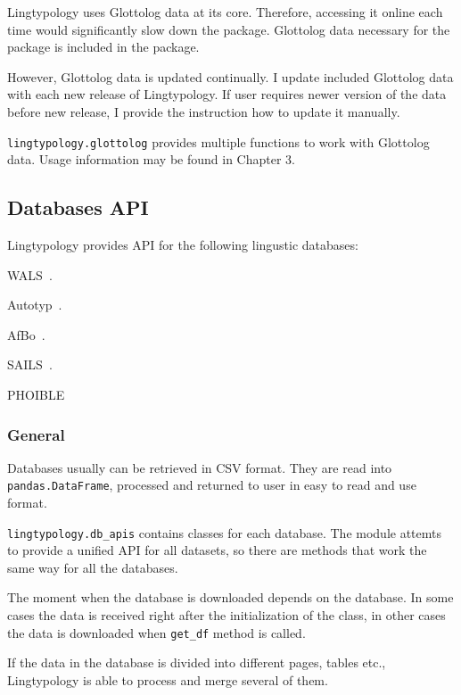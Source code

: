 \documentclass[a4paper,12pt]{article}
\begin{document}
Lingtypology uses Glottolog data at its core. Therefore, accessing it online each time would significantly slow down the package. Glottolog data necessary for the package is included in the package.

However, Glottolog data is updated continually. I update included Glottolog data with each new release of Lingtypology. If user requires newer version of the data before new release, I provide the instruction how to update it manually.

\texttt{lingtypology.glottolog} provides multiple functions to work with Glottolog data. Usage information may be found in Chapter 3.

\subsection{Databases API}

Lingtypology provides API for the following lingustic databases:
\begin{itemize}
\begin{samepage}
 \item WALS~\parencite{wals}.
 \item Autotyp~\parencite{autotyp}.
 \item AfBo~\parencite{afbo}.
 \item SAILS~\parencite{sails}.
 \item PHOIBLE~\parencite{phoible}
\end{samepage}
\end{itemize}

\subsubsection{General}
Databases usually can be retrieved in CSV format. They are read into \texttt{pandas.DataFrame}, processed and returned to user in easy to read and use format.

\texttt{lingtypology.db\_apis} contains classes for each database. The module attemts to provide a unified API for all datasets, so there are methods that work the same way for all the databases.

The moment when the database is downloaded depends on the database. In some cases the data is received right after the initialization of the class, in other cases the data is downloaded when \texttt{get\_df} method is called.

If the data in the database is divided into different pages, tables etc., Lingtypology is able to process and merge several of them.
\end{document}
